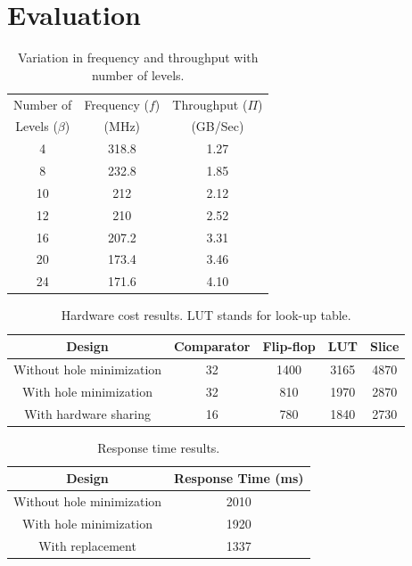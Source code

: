 \section{Evaluation}
\label{s:eval}

\begin{table}[!ht]
 \begin{center}
 \caption{Variation in frequency and throughput with number of levels.}
\label{table1}
\begin{tabular}{ |c|c|c| }
 \hline
 Number of & Frequency ($f$) & Throughput ($\Pi$) \\
 Levels ($\beta$) & (MHz)& (GB/Sec)\\
 \hline
 \hline
 4 & 318.8 &  1.27\\
 8 & 232.8 &  1.85\\
 10 & 212 &  2.12 \\
 12 & 210 &  2.52 \\
 16 & 207.2 &  3.31\\
 20 & 173.4 &  3.46 \\
 24 & 171.6 &  4.10\\
 \hline
\end{tabular}
\end{center}
\end{table}

\begin{table}[!ht]
 \begin{center}
 \caption{Hardware cost results. LUT stands for look-up table.}
\label{table2}
\begin{tabular}{|c|c|c|c|c|}
 \hline
 Design  & Comparator  & Flip-flop & LUT &Slice \\
 \hline
 \hline
Without hole minimization & 32 & 1400 & 3165 & 4870 \\
 \hline
With hole minimization & 32 & 810 & 1970 & 2870 \\
  \hline
With hardware sharing & 16 & 780 & 1840 & 2730 \\
\hline
\end{tabular}
\end{center}
\end{table}

\begin{table}[!ht]
 \begin{center}
 \caption{Response time results.}
\label{table3}
\begin{tabular}{ |c|c|}
 \hline
 Design  &  Response Time (ms) \\
 \hline
Without hole minimization & 2010 \\
  \hline
With hole minimization & 1920 \\
  \hline
With replacement & 1337 \\
  \hline
\end{tabular}
\end{center}
\end{table}

